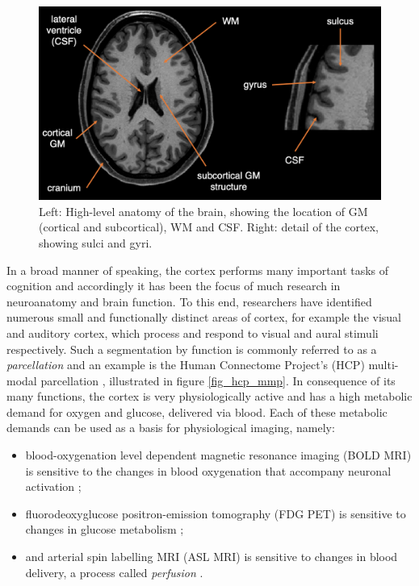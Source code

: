 \documentclass[12pt]{report}
\begin{document}
\begin{figure}
\centering
\includegraphics[width = \textwidth]{anatomy.png}
\caption{Left: High-level anatomy of the brain, showing the location of GM (cortical and subcortical), WM and CSF. Right: detail of the cortex, showing sulci and gyri.}
\label{anatomy}
\end{figure}

In a broad manner of speaking, the cortex performs many important tasks of cognition and accordingly it has been the focus of much research in neuroanatomy and brain function. To this end, researchers have identified numerous small and functionally distinct areas of cortex, for example the visual and auditory cortex, which process and respond to visual and aural stimuli respectively. Such a segmentation by function is commonly referred to as a \textit{parcellation} and an example is the Human Connectome Project's (HCP) multi-modal parcellation \cite{Glasser2016}, illustrated in figure \ref{fig_hcp_mmp}. In consequence of its many functions, the cortex is very physiologically active and has a high metabolic demand for oxygen and glucose, delivered via blood. Each of these metabolic demands can be used as a basis for physiological imaging, namely: 

\begin{itemize}

\item blood-oxygenation level dependent magnetic resonance imaging (BOLD MRI) is sensitive to the changes in blood oxygenation that accompany neuronal activation \cite{Jenkinson2017a}; 

\item fluorodeoxyglucose positron-emission tomography (FDG PET) is sensitive to changes in glucose metabolism \cite{Bohnen2013}; 

\item and arterial spin labelling MRI (ASL MRI) is sensitive to changes in blood delivery, a process called \textit{perfusion} \cite{Alsop2015}.  

\end{itemize}
\end{document}
